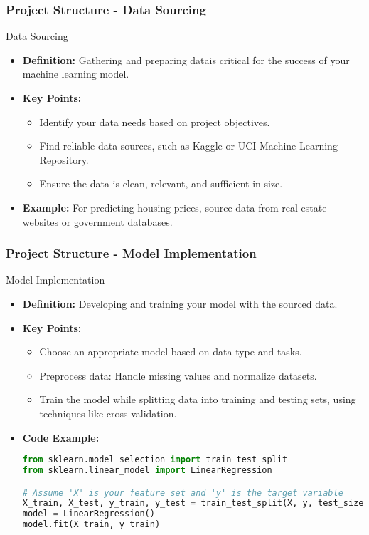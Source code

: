 \documentclass[aspectratio=169]{beamer}
\begin{document}
\begin{frame}[fragile]
    \frametitle{Project Structure - Data Sourcing}
    \begin{block}{Data Sourcing}
        \begin{itemize}
            \item \textbf{Definition:} Gathering and preparing datais critical for the success of your machine learning model.
            \item \textbf{Key Points:}
                \begin{itemize}
                    \item Identify your data needs based on project objectives.
                    \item Find reliable data sources, such as Kaggle or UCI Machine Learning Repository.
                    \item Ensure the data is clean, relevant, and sufficient in size.
                \end{itemize}
            \item \textbf{Example:} For predicting housing prices, source data from real estate websites or government databases.
        \end{itemize}
    \end{block}
\end{frame}

\begin{frame}[fragile]
    \frametitle{Project Structure - Model Implementation}
    \begin{block}{Model Implementation}
        \begin{itemize}
            \item \textbf{Definition:} Developing and training your model with the sourced data.
            \item \textbf{Key Points:}
                \begin{itemize}
                    \item Choose an appropriate model based on data type and tasks.
                    \item Preprocess data: Handle missing values and normalize datasets.
                    \item Train the model while splitting data into training and testing sets, using techniques like cross-validation.
                \end{itemize}
            \item \textbf{Code Example:}
            \begin{lstlisting}[language=Python]
from sklearn.model_selection import train_test_split
from sklearn.linear_model import LinearRegression

# Assume 'X' is your feature set and 'y' is the target variable
X_train, X_test, y_train, y_test = train_test_split(X, y, test_size=0.2)
model = LinearRegression()
model.fit(X_train, y_train)
            \end{lstlisting}
        \end{itemize}
    \end{block}
\end{frame}
\end{document}
